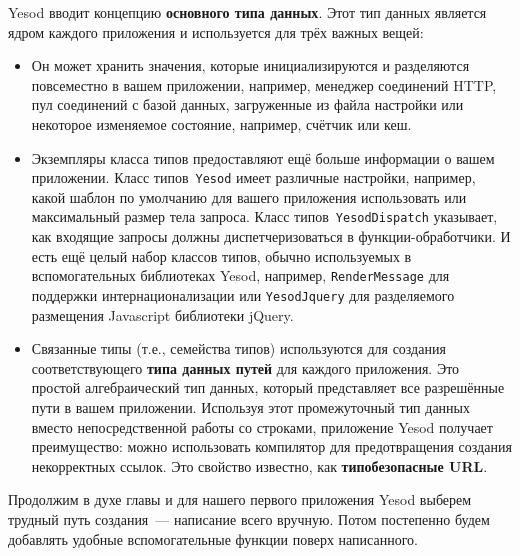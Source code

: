 Yesod вводит концепцию \textbf{основного типа данных}. Этот тип данных является
ядром каждого приложения и используется для трёх важных вещей:
\begin{itemize}
    \item Он может хранить значения, которые инициализируются и разделяются
        повсеместно в вашем приложении, например, менеджер соединений HTTP, пул
        соединений с базой данных, загруженные из файла настройки или некоторое
        изменяемое состояние, например, счётчик или кеш.

    \item Экземпляры класса типов предоставляют ещё больше информации о вашем
        приложении. Класс типов~\lstinline'Yesod' имеет различные настройки,
        например, какой шаблон по умолчанию для вашего приложения использовать
        или максимальный размер тела запроса. Класс
        типов~\lstinline'YesodDispatch' указывает, как входящие запросы должны
        диспетчеризоваться в функции-обработчики. И есть ещё целый набор
        классов типов, обычно используемых в вспомогательных библиотеках Yesod,
        например, \lstinline'RenderMessage' для поддержки интернационализации
        или \lstinline'YesodJquery' для разделяемого размещения Javascript
        библиотеки jQuery.

    \item Связанные типы (т.е., семейства типов) используются для создания
        соответствующего \textbf{типа данных путей} для каждого приложения. Это
        простой алгебраический тип данных, который представляет все разрешённые
        пути в вашем приложении. Используя этот промежуточный тип данных вместо
        непосредственной работы со строками, приложение Yesod получает
        преимущество: можно использовать компилятор для предотвращения создания
        некорректных ссылок. Это свойство известно, как \textbf{типобезопасные
            URL}.
\end{itemize}

Продолжим в духе главы и для нашего первого приложения Yesod выберем трудный
путь создания~--- написание всего вручную. Потом постепенно будем добавлять
удобные вспомогательные функции поверх написанного.

